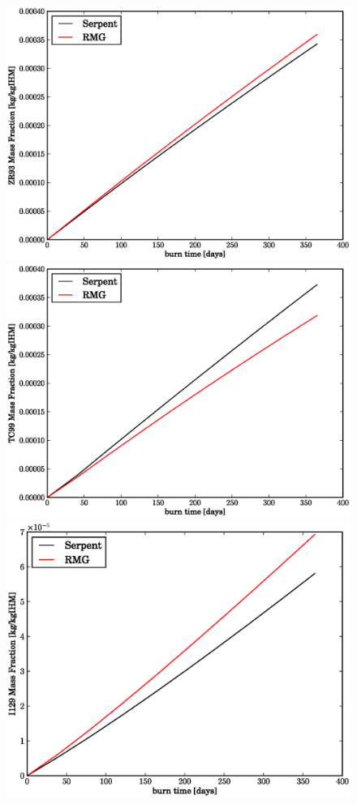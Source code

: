 \begin{figure}[htbp]
\begin{center}
\includegraphics[scale=0.3]{multigroup_method/figs/benchmark/ZR93_Mass_Fraction_.eps}
\includegraphics[scale=0.3]{multigroup_method/figs/benchmark/TC99_Mass_Fraction_.eps}
\includegraphics[scale=0.3]{multigroup_method/figs/benchmark/I129_Mass_Fraction_.eps}
\end{center}
\end{figure}

